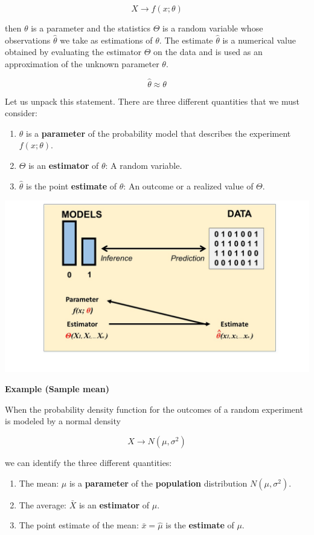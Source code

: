 \documentclass[
]{book}
\providecommand{\tightlist}{%
  \setlength{\itemsep}{0pt}\setlength{\parskip}{0pt}}
\begin{document}
\[X \rightarrow f(x; \theta)\]

then \(\theta\) is a parameter and the statistics \(\Theta\) is a random variable whose observations \(\hat{\theta}\) we take as estimations of \(\theta\). The estimate \(\hat{\theta}\) is a numerical value obtained by evaluating the estimator \(\Theta\) on the data and is used as an approximation of the unknown parameter \(\theta\).

\[\hat{\theta} \approx \theta\]

Let us unpack this statement. There are three different quantities that we must consider:

\begin{enumerate}
\def\labelenumi{\arabic{enumi}.}
\tightlist
\item
  \(\theta\) is a \textbf{parameter} of the probability model that describes the experiment \(f(x; \theta)\).
\item
  \(\Theta\) is an \textbf{estimator} of \(\theta\): A random variable.
\item
  \(\hat{\theta}\) is the point \textbf{estimate} of \(\theta\): An outcome or a realized value of \(\Theta\).
\end{enumerate}

\includegraphics{./figures/estimator.JPG}

\textbf{Example (Sample mean)}

When the probability density function for the outcomes of a random experiment is modeled by a normal density

\[X \rightarrow N(\mu, \sigma^2)\]

we can identify the three different quantities:

\begin{enumerate}
\def\labelenumi{\arabic{enumi}.}
\tightlist
\item
  The mean: \(\mu\) is a \textbf{parameter} of the \textbf{population} distribution \(N(\mu, \sigma^2)\).
\item
  The average: \(\bar{X}\) is an \textbf{estimator} of \(\mu\).
\item
  The point estimate of the mean: \(\bar{x}=\hat{\mu}\) is the \textbf{estimate} of \(\mu\).
\end{enumerate}
\end{document}
